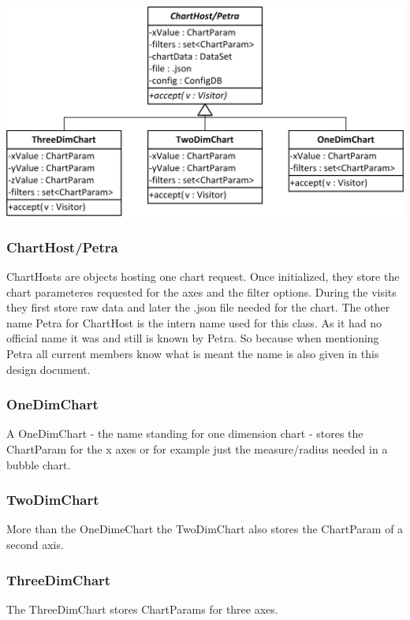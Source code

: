 \begin{center}
\includegraphics{Pictures/Parts/Petra.png}
\end{center}  

\subsubsection*{ChartHost/Petra}
ChartHosts are objects hosting one chart request. Once initialized, they store the chart parameteres requested for
the axes and the filter options. During the visits they first store raw data and later the .json file needed
for the chart.
The other name Petra for ChartHost is the intern name used for this class. As it had no official name it was
and still is known by Petra. So because when mentioning Petra all current members know what is meant the name
is also given in this design document.

\subsubsection*{OneDimChart}
A OneDimChart - the name standing for one dimension chart - stores the ChartParam for the x axes or for example
just the measure/radius needed in a bubble chart.
 
 
\subsubsection*{TwoDimChart}
More than the OneDimeChart the TwoDimChart also stores the ChartParam of a second axis.

\subsubsection*{ThreeDimChart} 
The ThreeDimChart stores ChartParams for three axes.

